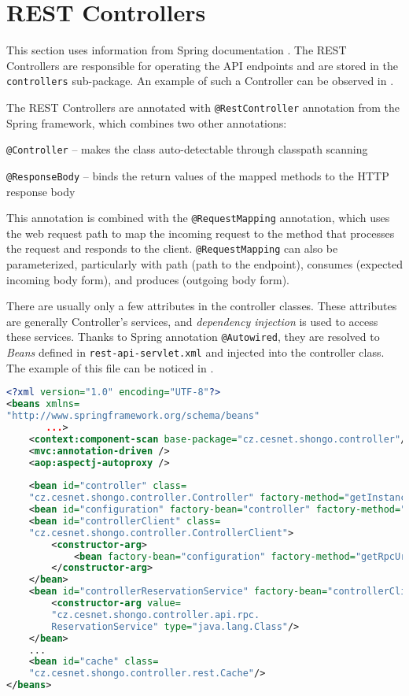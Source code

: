 \section{REST Controllers}
This section uses information from Spring documentation \cite{springdocumentation}.
The REST Controllers are responsible for operating the API endpoints and are stored in the \texttt{controllers} sub-package. An example of such a Controller can be observed in .

The REST Controllers are annotated with \texttt{@RestController} annotation from the Spring framework, which combines two other annotations:
\begin{description}
    \item \texttt{@Controller} -- makes the class auto-detectable through classpath scanning
    \item \texttt{@ResponseBody} -- binds the return values of the mapped methods to the HTTP response body
\end{description}
This annotation is combined with the \texttt{@RequestMapping} annotation, which uses the web request path to map the incoming request to the method that processes the request and responds to the client. \texttt{@RequestMapping} can also be parameterized, particularly with path (path to the endpoint), consumes (expected incoming body form), and produces (outgoing body form).

There are usually only a few attributes in the controller classes. These attributes are generally Controller’s services, and \emph{dependency injection} is used to access these services. Thanks to Spring annotation \texttt{@Autowired}, they are resolved to \emph{Beans} defined in \texttt{rest-api-servlet.xml} and injected into the controller class. The example of this file can be noticed in .

\begin{lstlisting}[language=XML, caption=rest-api-servlet.xml, label=lst:beans]
<?xml version="1.0" encoding="UTF-8"?>
<beans xmlns=
"http://www.springframework.org/schema/beans"
       ...>
    <context:component-scan base-package="cz.cesnet.shongo.controller"/>
    <mvc:annotation-driven />
    <aop:aspectj-autoproxy />
    
    <bean id="controller" class=
    "cz.cesnet.shongo.controller.Controller" factory-method="getInstance"/>
    <bean id="configuration" factory-bean="controller" factory-method="getConfiguration"/>
    <bean id="controllerClient" class=
    "cz.cesnet.shongo.controller.ControllerClient">
        <constructor-arg>
            <bean factory-bean="configuration" factory-method="getRpcUrl"/>
        </constructor-arg>
    </bean>
    <bean id="controllerReservationService" factory-bean="controllerClient" factory-method="getService">
        <constructor-arg value=
        "cz.cesnet.shongo.controller.api.rpc.
        ReservationService" type="java.lang.Class"/>
    </bean>
    ...
    <bean id="cache" class=
    "cz.cesnet.shongo.controller.rest.Cache"/>
</beans>
\end{lstlisting}

